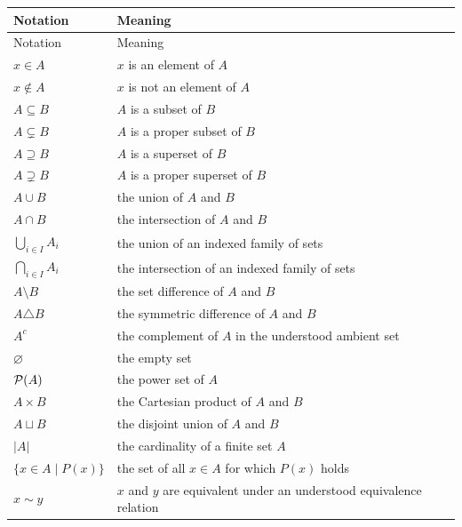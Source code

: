     {\small
    \renewcommand{\arraystretch}{1.18}
    \begin{longtable}{@{}L{0.27\textwidth}L{0.65\textwidth}@{}}
        \toprule
        Notation & Meaning \\
        \midrule
        \endfirsthead

        \toprule
        Notation & Meaning \\
        \midrule
        \endhead

        \bottomrule
        \endlastfoot

        $x\in A$ & $x$ is an element of $A$ \\
        $x\notin A$ & $x$ is not an element of $A$ \\
        $A\subseteq B$ & $A$ is a subset of $B$ \\
        $A\subsetneq B$ & $A$ is a proper subset of $B$ \\
        $A\supseteq B$ & $A$ is a superset of $B$ \\
        $A\supsetneq B$ & $A$ is a proper superset of $B$ \\
        $A\cup B$ & the union of $A$ and $B$ \\
        $A\cap B$ & the intersection of $A$ and $B$ \\
        $\displaystyle\bigcup_{i\in I}A_i$ & the union of an indexed family of sets \\
        $\displaystyle\bigcap_{i\in I}A_i$ & the intersection of an indexed family of sets \\
        $A\setminus B$ & the set difference of $A$ and $B$ \\
        $A\triangle B$ & the symmetric difference of $A$ and $B$ \\
        $A^c$ & the complement of $A$ in the understood ambient set \\
        $\varnothing$ & the empty set \\
        $\mathcal{P}(A)$ & the power set of $A$ \\
        $A\times B$ & the Cartesian product of $A$ and $B$ \\
        $A\sqcup B$ & the disjoint union of $A$ and $B$ \\
        $|A|$ & the cardinality of a finite set $A$ \\
        $\{x\in A\mid P(x)\}$ & the set of all $x\in A$ for which $P(x)$ holds \\
        $x\sim y$ & $x$ and $y$ are equivalent under an understood equivalence relation \\

\end{longtable}}
